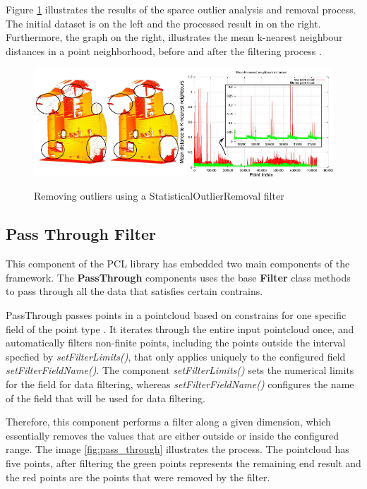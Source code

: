 \documentclass[12pt]{report}
\begin{document}
Figure \ref{fig:statistical_removal_2} illustrates the results of the sparce outlier analysis and  removal process.
The initial dataset is on the left and the processed result in on the right. Furthermore, the graph on the right, illustrates the mean k-nearest neighbour distances in a point 
neighborhood, before and after the filtering process \cite[]{Rusu_ICRA2011_PCL}.

\begin{figure}[H]%
  \centering
  \includegraphics[width=1\textwidth]{statistical_removal_2.jpg}
 \caption{Removing outliers using a StatisticalOutlierRemoval filter}\cite[]{Rusu_ICRA2011_PCL}
 \label{fig:statistical_removal_2} 
\end{figure}

\subsection{Pass Through Filter}
This component of the PCL library has embedded two main components of the framework. 
The \textbf{PassThrough} components uses the base \textbf{Filter} class methods to pass through all the data that satisfies certain contrains.

PassThrough passes points in a pointcloud based on constrains for one specific field of the point type .
It iterates through the entire input pointcloud once, and automatically filters non-finite points, including the points outside the interval specfied by \textit{setFilterLimits()}, 
that only applies uniquely to the configured field \textit{setFilterFieldName()}. 
The component \textit{setFilterLimits()} sets the numerical limits for the field for data filtering, whereas \textit{setFilterFieldName()} configures the name of the field that will be used for data filtering.

Therefore, this component performs a filter along a given dimension, which essentially removes the values that are either outside or inside the configured range.
The image \ref{fig:pass_through} illustrates the process. The pointcloud has five points, after filtering the green points represents the remaining end result and the red points are the points that were removed by the filter.
\end{document}
